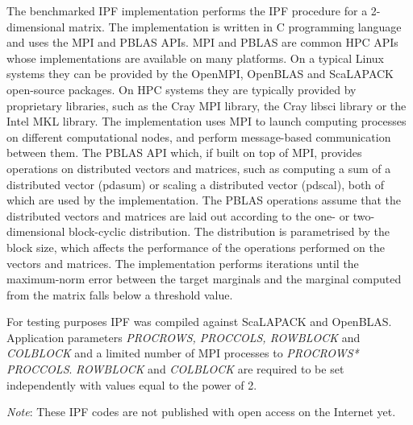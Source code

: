 The benchmarked IPF implementation performs the IPF procedure for a 2-dimensional matrix.
The implementation is written in C programming language and uses the MPI and PBLAS APIs. MPI and PBLAS are common HPC APIs whose implementations are available on many platforms. On a typical Linux systems they can be provided by the OpenMPI, OpenBLAS and \textsf{ScaLAPACK} open-source packages. On HPC systems they are typically provided by proprietary libraries, such as the Cray MPI library, the Cray libsci library or the Intel MKL library.
The implementation uses MPI to launch computing processes on different computational nodes, and perform message-based communication between them. The PBLAS API which, if built on top of MPI, provides operations on distributed vectors and matrices, such as computing a sum of a distributed vector (pdasum) or scaling a distributed vector (pdscal), both of which are used by the implementation.
The PBLAS operations assume that the distributed vectors and matrices are laid out according to the one- or two-dimensional block-cyclic distribution. The distribution is parametrised by the block size, which affects the performance of the operations performed on the vectors and matrices.
The implementation performs iterations until the maximum-norm error between the target marginals and the marginal computed from the matrix falls below a threshold value.

For testing purposes IPF was compiled against \textsf{ScaLAPACK} and OpenBLAS. 
Application parameters \textit{PROCROWS, PROCCOLS, ROWBLOCK} and \textit{COLBLOCK}  and a limited number of MPI processes to \textit{PROCROWS* PROCCOLS}. \textit{ROWBLOCK} and \textit{COLBLOCK} are required to be set independently with values equal to the power of 2.

\fi

\textit{Note}: These IPF codes are not published with open access on the Internet yet.

